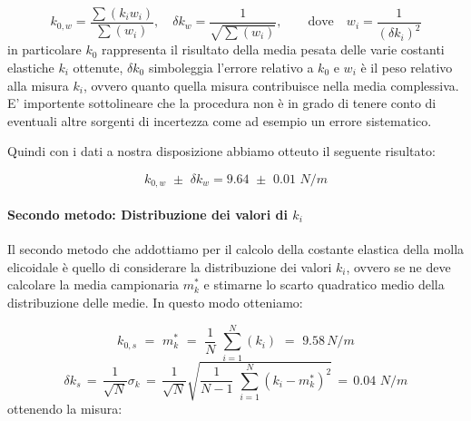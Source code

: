 \begin{equation*}
    k_{0,w} = \frac{\sum (k_i w_i)}{\sum (w_i)} , \quad \delta k_{w} = \frac{1}{\sqrt{\sum (w_i)}} , \qquad \text{dove} \quad w_i = \frac{1}{(\delta k_i)^2}
\end{equation*}
%
in particolare $k_0$ rappresenta il risultato della media pesata delle varie costanti elastiche $k_i$ ottenute, $\delta k_0$ simboleggia l'errore relativo a $k_0$ e $w_i$ è il peso relativo alla misura $k_i$, ovvero quanto quella misura contribuisce nella media complessiva. E' importente sottolineare che la procedura non è in grado di tenere conto di eventuali altre sorgenti di incertezza come ad esempio un errore sistematico.

Quindi con i dati a nostra disposizione abbiamo otteuto il seguente risultato:

\begin{equation}
    k_{0,w} \,\, \pm \,\, \delta k_{w} =  9.64 \,\, \pm \,\, 0.01 \,\,N/m
    \label{eq:w}
\end{equation}

\paragraph{Secondo metodo: Distribuzione dei valori di $k_i$\\}
Il secondo metodo che addottiamo per il calcolo della costante elastica della molla elicoidale è quello di considerare la distribuzione dei valori $k_i$, ovvero se ne deve calcolare la media campionaria $m^*_k$ e stimarne lo scarto quadratico medio della distribuzione delle medie. In questo modo otteniamo:

\begin{equation*}
    k_{0,s} \,\,=\,\, m^*_k \,\,=\,\, \frac{1}{N}\,\,\sum_{i=1}^{N} (k_i) \,\,=\,\, 9.58  \,N/m
\end{equation*}
%
\begin{equation*}
    \delta k_{s}  \,=\, \frac{1}{\sqrt{N}} \sigma_{k} \,=\, \frac{1}{\sqrt{N}}\sqrt{\frac{1}{N - 1}\,\,\sum_{i=1}^{N} (k_i - m^*_k)^2}\,=\, 0.04 \,\,N/m
\end{equation*}
%
ottenendo la misura:

